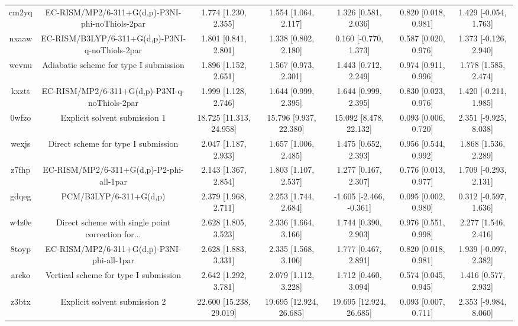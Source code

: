 \documentclass{article}
\begin{document}
\begin{center}
\begin{longtable}{|ccccccc|}
 cm2yq &    EC-RISM/MP2/6-311+G(d,p)-P3NI-phi-noThiols-2par &     1.774 [1.230, 2.355] &     1.554 [1.064, 2.117] &     1.326 [0.581, 2.036] &  0.820 [0.018, 0.981] &   1.429 [-0.054, 1.763] \\
 nxaaw &    EC-RISM/B3LYP/6-311+G(d,p)-P3NI-q-noThiols-2par &     1.801 [0.841, 2.801] &     1.338 [0.802, 2.180] &    0.160 [-0.770, 1.373] &  0.587 [0.020, 0.976] &   1.373 [-0.126, 2.940] \\
 wcvnu &             Adiabatic scheme for type I submission &     1.896 [1.152, 2.651] &     1.567 [0.973, 2.301] &     1.443 [0.712, 2.249] &  0.974 [0.911, 0.996] &    1.778 [1.585, 2.474] \\
 kxztt &      EC-RISM/MP2/6-311+G(d,p)-P3NI-q-noThiols-2par &     1.999 [1.128, 2.746] &     1.644 [0.999, 2.395] &     1.644 [0.999, 2.395] &  0.830 [0.023, 0.976] &   1.420 [-0.211, 1.985] \\
 0wfzo &                      Explicit solvent submission 1 &  18.725 [11.313, 24.958] &   15.796 [9.937, 22.380] &   15.092 [8.478, 22.132] &  0.093 [0.006, 0.720] &   2.351 [-9.925, 8.038] \\
 wexjs &                Direct scheme for type I submission &     2.047 [1.187, 2.933] &     1.657 [1.006, 2.485] &     1.475 [0.652, 2.393] &  0.956 [0.544, 0.992] &    1.868 [1.536, 2.289] \\
 z7fhp &           EC-RISM/MP2/6-311+G(d,p)-P2-phi-all-1par &     2.143 [1.367, 2.854] &     1.803 [1.107, 2.537] &     1.277 [0.167, 2.307] &  0.776 [0.013, 0.977] &   1.709 [-0.293, 2.131] \\
 gdqeg &                             PCM/B3LYP/6-311+G(d,p) &     2.379 [1.968, 2.711] &     2.253 [1.744, 2.684] &  -1.605 [-2.466, -0.361] &  0.095 [0.002, 0.980] &   0.312 [-0.597, 1.636] \\
 w4z0e &  Direct scheme with single point correction for... &     2.628 [1.805, 3.523] &     2.336 [1.664, 3.166] &     1.744 [0.390, 2.903] &  0.976 [0.551, 0.998] &    2.277 [1.546, 2.416] \\
 8toyp &         EC-RISM/MP2/6-311+G(d,p)-P3NI-phi-all-1par &     2.628 [1.883, 3.331] &     2.335 [1.568, 3.106] &     1.777 [0.467, 2.891] &  0.820 [0.018, 0.981] &   1.939 [-0.097, 2.382] \\
 arcko &              Vertical scheme for type I submission &     2.642 [1.292, 3.781] &     2.079 [1.112, 3.228] &     1.712 [0.460, 3.094] &  0.574 [0.045, 0.945] &    1.416 [0.577, 2.932] \\
 z3btx &                      Explicit solvent submission 2 &  22.600 [15.238, 29.019] &  19.695 [12.924, 26.685] &  19.695 [12.924, 26.685] &  0.093 [0.007, 0.711] &   2.353 [-9.984, 8.060] \\

\end{longtable}
\end{center}
\end{document}
